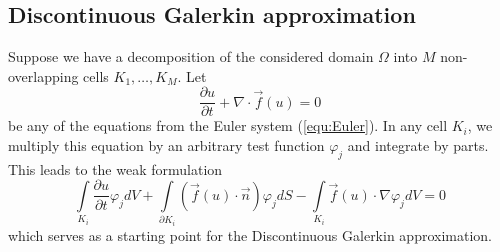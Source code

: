\subsection{Discontinuous Galerkin approximation}

Suppose we have a decomposition of the considered domain $\Omega$ into $M$
non-overlapping cells $K_1, \ldots, K_M$. Let
\begin{equation}
	\frac{\partial u}{\partial t} + \nabla \cdot \vec{f}(u) = 0
\end{equation}
be any of the equations from the Euler system (\ref{equ:Euler}). In any cell
$K_i$, we multiply this equation by an arbitrary test function $\varphi_j$
and integrate by parts. This leads to the weak formulation
\begin{equation}
	\label{eqn:Euler_weak}
	\int \limits_{K_i} \frac{\partial u}{\partial t} \varphi_j dV
	+ \int \limits_{\partial K_i} \left(\vec{f}(u) \cdot \vec{n} \right) \varphi_j dS
	- \int \limits_{K_i} \vec{f}(u) \cdot \nabla \varphi_j dV
	= 0
\end{equation}
which serves as a starting point for the Discontinuous Galerkin approximation.

